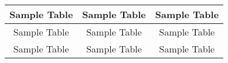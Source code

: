 \begin{tabular}{ccc} \toprule
    Sample Table & Sample Table & Sample Table \\ \midrule
    Sample Table & Sample Table & Sample Table \\
    Sample Table & Sample Table & Sample Table \\ \bottomrule
\end{tabular}